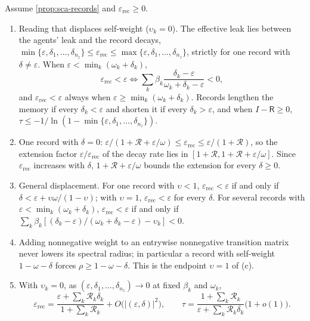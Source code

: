 \begin{proposition}\label{prop:sca-records-memory}
Assume \cref{prop:sca-records} and $\varepsilon_{\mathrm{rec}}\ge0$.
\begin{enumerate}
\item[(a)] Reading that displaces self-weight ($\upsilon_k=0$). The effective leak lies between the agents' leak and the record decays, $\min\{\varepsilon,\delta_1,\dots,\delta_{n_z}\}\le\varepsilon_{\mathrm{rec}}\le\max\{\varepsilon,\delta_1,\dots,\delta_{n_z}\}$, strictly for one record with $\delta\neq\varepsilon$. When $\varepsilon<\min_k(\omega_k+\delta_k)$,
\begin{equation}\label{eq:sca-memory-criterion}
\varepsilon_{\mathrm{rec}}<\varepsilon\iff\sum_k\beta_k\frac{\delta_k-\varepsilon}{\omega_k+\delta_k-\varepsilon}<0,
\end{equation}
and $\varepsilon_{\mathrm{rec}}<\varepsilon$ always when $\varepsilon\ge\min_k(\omega_k+\delta_k)$. Records lengthen the memory if every $\delta_k<\varepsilon$ and shorten it if every $\delta_k>\varepsilon$, and when $I-\mathsf R\ge0$, $\tau\le-1/\ln(1-\min\{\varepsilon,\delta_1,\dots,\delta_{n_z}\})$.
\item[(b)] One record with $\delta=0$: $\varepsilon/(1+\mathcal R+\varepsilon/\omega)\le\varepsilon_{\mathrm{rec}}\le\varepsilon/(1+\mathcal R)$, so the extension factor $\varepsilon/\varepsilon_{\mathrm{rec}}$ of the decay rate lies in $[1+\mathcal R,1+\mathcal R+\varepsilon/\omega]$. Since $\varepsilon_{\mathrm{rec}}$ increases with $\delta$, $1+\mathcal R+\varepsilon/\omega$ bounds the extension for every $\delta\ge0$.
\item[(c)] General displacement. For one record with $\upsilon<1$, $\varepsilon_{\mathrm{rec}}<\varepsilon$ if and only if $\delta<\varepsilon+\upsilon\omega/(1-\upsilon)$; with $\upsilon=1$, $\varepsilon_{\mathrm{rec}}<\varepsilon$ for every $\delta$. For several records with $\varepsilon<\min_k(\omega_k+\delta_k)$, $\varepsilon_{\mathrm{rec}}<\varepsilon$ if and only if $\sum_k\beta_k[(\delta_k-\varepsilon)/(\omega_k+\delta_k-\varepsilon)-\upsilon_k]<0$.
\item[(d)] Adding nonnegative weight to an entrywise nonnegative transition matrix never lowers its spectral radius; in particular a record with self-weight $1-\omega-\delta$ forces $\rho\ge1-\omega-\delta$. This is the endpoint $\upsilon=1$ of (c).
\item[(e)] With $\upsilon_k=0$, as $(\varepsilon,\delta_1,\dots,\delta_{n_z})\to0$ at fixed $\beta_k$ and $\omega_k$,
\begin{equation}\label{eq:sca-records-tau}
\varepsilon_{\mathrm{rec}}=\frac{\varepsilon+\sum_k\mathcal R_k\delta_k}{1+\sum_k\mathcal R_k}+O\bigl(|(\varepsilon,\delta)|^2\bigr),\qquad\tau=\frac{1+\sum_k\mathcal R_k}{\varepsilon+\sum_k\mathcal R_k\delta_k}\bigl(1+o(1)\bigr).
\end{equation}
\end{enumerate}
\end{proposition}
